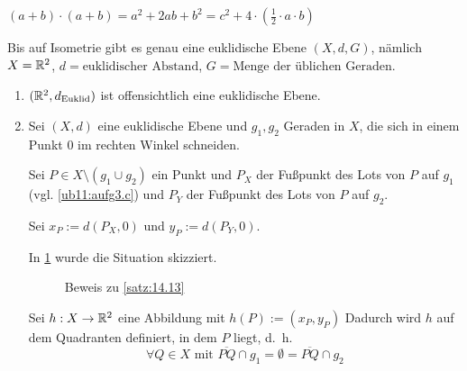 \begin{beweis}
    $(a+b) \cdot (a+b) = a^2 + 2ab + b^2 = c^2 +4 \cdot (\frac{1}{2} \cdot a \cdot b)$
\end{beweis}

\begin{satz}\label{satz:14.13} %
    Bis auf Isometrie gibt es genau eine euklidische Ebene $(X, d, G)$, nämlich
    $X=\mathbb{R}^2$, $d = \text{euklidischer Abstand}$, $G = \text{Menge der üblichen Geraden}$.
\end{satz}

\begin{beweis}\leavevmode
    \begin{enumerate}[label=(\roman*)]
        \item $(\mathbb{R}^2, d_\text{Euklid})$ ist offensichtlich eine euklidische Ebene.
        \item Sei $(X,d)$ eine euklidische Ebene und $g_1, g_2$ Geraden
              in $X$, die sich in einem Punkt $0$ im rechten Winkel
              schneiden. 

              Sei $P \in X \setminus (g_1 \cup g_2)$ ein Punkt und $P_X$ der 
              Fußpunkt des Lots von $P$ auf $g_1$ (vgl. \cref{ub11:aufg3.c}) 
              und $P_Y$ der Fußpunkt des Lots von $P$ auf $g_2$.

              Sei $x_P := d(P_X, 0)$ und $y_P := d(P_Y, 0)$.

              In \cref{fig:14.13.0.1} wurde die Situation skizziert.

            \begin{figure}[htp]
                \centering
                \subfloat[Schritt 1]{
                    \resizebox{0.45\linewidth}{!}{}
                    \label{fig:14.13.1}
                }%
                \subfloat[Schritt 2]{
                    \resizebox{0.45\linewidth}{!}{}
                    \label{fig:14.13.2}
                }%
                \caption{Beweis zu \cref{satz:14.13}}
                \label{fig:14.13.0.1}
            \end{figure}

            
              Sei $h:X \rightarrow \mathbb{R}^2$ eine Abbildung mit
              $h(P) := (x_P, y_P)$
              Dadurch wird $h$ auf dem Quadranten
              definiert, in dem $P$ liegt, d.~h. 
              \[\forall Q \in X \text{ mit } \overline{PQ} \cap g_1 = \emptyset = \overline{PQ} \cap g_2\]


\end{enumerate}
\end{beweis}
